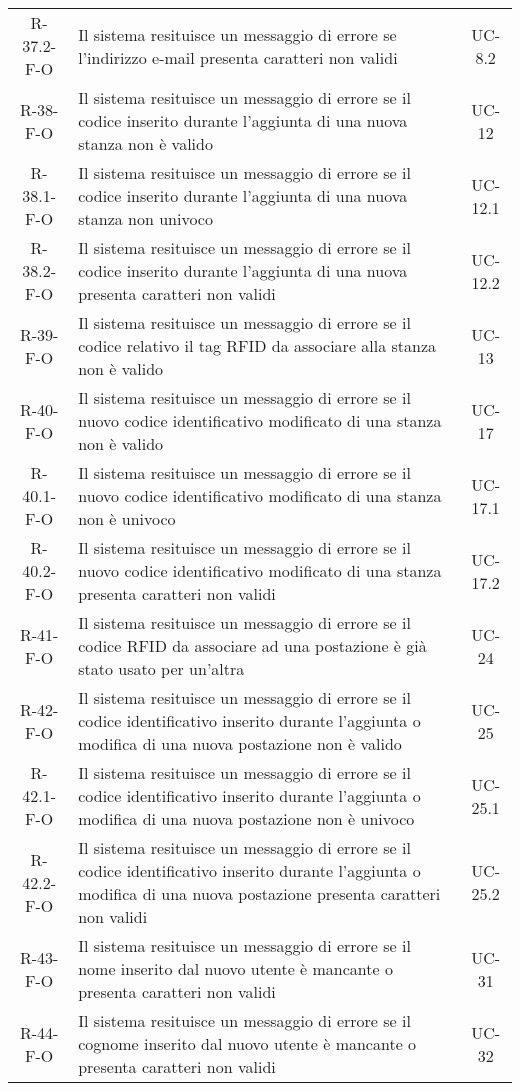 \begin{longtable}{ c C{9.5cm} c }
    R-37.2-F-O & Il sistema resituisce un messaggio di errore se l'indirizzo e-mail presenta caratteri non validi& UC-8.2\\
    R-38-F-O & Il sistema resituisce un messaggio di errore se il codice inserito durante l'aggiunta di una nuova stanza non è valido& UC-12\\
    R-38.1-F-O & Il sistema resituisce un messaggio di errore se il codice inserito durante l'aggiunta di una nuova stanza non univoco& UC-12.1\\
    R-38.2-F-O & Il sistema resituisce un messaggio di errore se il codice inserito durante l'aggiunta di una nuova presenta caratteri non validi& UC-12.2\\
    R-39-F-O & Il sistema resituisce un messaggio di errore se il codice relativo il tag RFID da associare alla stanza non è valido& UC-13\\
    R-40-F-O & Il sistema resituisce un messaggio di errore se il nuovo codice identificativo modificato di una stanza non è valido& UC-17\\
    R-40.1-F-O & Il sistema resituisce un messaggio di errore se il nuovo codice identificativo modificato di una stanza non è univoco& UC-17.1\\
    R-40.2-F-O & Il sistema resituisce un messaggio di errore se il nuovo codice identificativo modificato di una stanza presenta caratteri non validi& UC-17.2\\
    R-41-F-O & Il sistema resituisce un messaggio di errore se il codice RFID da associare ad una postazione è già stato usato per un'altra& UC-24\\
    R-42-F-O & Il sistema resituisce un messaggio di errore se il codice identificativo inserito durante l'aggiunta o modifica di una nuova postazione non è valido& UC-25\\
    R-42.1-F-O & Il sistema resituisce un messaggio di errore se il codice identificativo inserito durante l'aggiunta o modifica di una nuova postazione non è univoco& UC-25.1\\
    R-42.2-F-O & Il sistema resituisce un messaggio di errore se il codice identificativo inserito durante l'aggiunta o modifica di una nuova postazione presenta caratteri non validi& UC-25.2\\
    R-43-F-O & Il sistema resituisce un messaggio di errore se il nome inserito dal nuovo utente è mancante o presenta caratteri non validi& UC-31\\
    R-44-F-O & Il sistema resituisce un messaggio di errore se il cognome inserito dal nuovo utente è mancante o presenta caratteri non validi& UC-32\\

\end{longtable}
